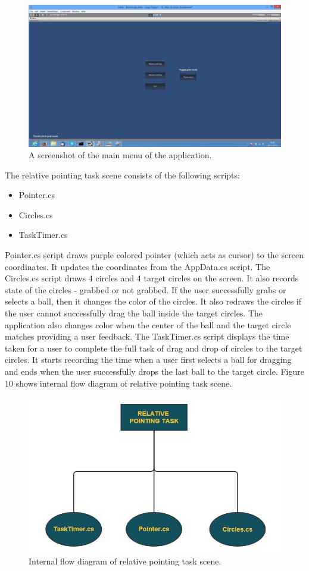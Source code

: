 \documentclass{article}
\begin{document}
\begin{figure}[!h]
\centering
\includegraphics[width=7.0in]{Figure_8}
\caption{A screenshot of the main menu of the application.}
\end{figure}

The relative pointing task scene consists of the following scripts:

\begin{itemize}
    \item Pointer.cs
    \item Circles.cs
    \item TaskTimer.cs
\end{itemize}

Pointer.cs script draws purple colored pointer (which acts as cursor) to the screen coordinates. It updates the coordinates from the AppData.cs script. The Circles.cs script draws 4 circles and 4 target circles on the screen. It also records state of the circles - grabbed or not grabbed. If the user successfully grabs or selects a ball, then it changes the color of the circles. It also redraws the circles if the user cannot successfully drag the ball inside the target circles. The application also changes color when the center of the ball and the target circle matches providing a user feedback. The TaskTimer.cs script displays the time taken for a user to complete the full task of drag and drop of circles to the target circles. It starts recording the time when a user first selects a ball for dragging and ends when the user successfully drops the last ball to the target circle. Figure 10 shows internal flow diagram of relative pointing task scene. 

\begin{figure}[!h]
    \centering
    \includegraphics[width=4.5in]{Figure_9}
    \caption{Internal flow diagram of relative pointing task scene.}
\end{figure}
 
\end{document}
